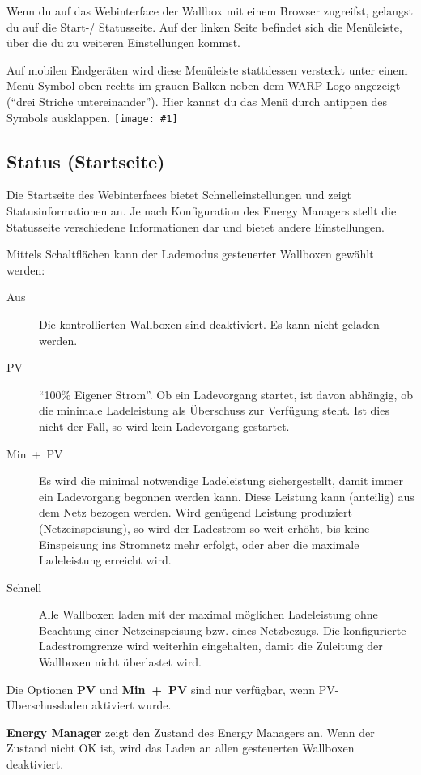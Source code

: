 \documentclass[a4paper,10pt]{article}
\newcommand{\gfx}[1]{\texttt{[image: \#1]}}
\begin{document}
\begin{multicols*}{2}
	Wenn du auf das Webinterface der Wallbox mit einem Browser zugreifst,
	gelangst du auf die Start-/ Statusseite. Auf der linken Seite befindet sich
	die Menüleiste, über die du zu weiteren Einstellungen kommst.

	Auf mobilen Endgeräten wird
	diese Menüleiste stattdessen versteckt unter einem Menü-Symbol oben rechts
	im grauen Balken neben dem WARP Logo angezeigt (\enquote{drei Striche untereinander}).
	Hier kannst du das Menü durch antippen des Symbols ausklappen.
	\gfx{./img_v2/wem2-web-status}

	\subsection{Status (Startseite)}
	\label{status}
	Die Startseite des Webinterfaces bietet Schnelleinstellungen und zeigt Statusinformationen an.
    Je nach Konfiguration des Energy Managers stellt die Statusseite verschiedene Informationen dar und bietet andere Einstellungen.

	Mittels Schaltflächen kann der Lademodus gesteuerter
	Wallboxen gewählt werden:
	\begin{description}
	\item[Aus] Die kontrollierten Wallboxen sind deaktiviert. Es kann
	nicht geladen werden.
	\item[PV] \enquote{100\% Eigener Strom}. Ob ein
	Ladevorgang startet, ist davon abhängig, ob die minimale Ladeleistung
	als Überschuss zur Verfügung steht. Ist dies nicht der Fall, so
	wird kein Ladevorgang gestartet.
	\item[Min~+~PV] Es wird die minimal notwendige Ladeleistung sichergestellt, damit immer ein Ladevorgang begonnen werden kann. Diese Leistung kann (anteilig) aus dem Netz bezogen werden. Wird genügend Leistung produziert (Netzeinspeisung), so wird
	der Ladestrom so weit erhöht, bis keine Einspeisung ins Stromnetz mehr
	erfolgt, oder aber die maximale Ladeleistung erreicht wird.
	\item[Schnell] Alle Wallboxen laden mit der maximal möglichen
	Ladeleistung ohne Beachtung einer Netzeinspeisung bzw. eines Netzbezugs. Die konfigurierte Ladestromgrenze wird weiterhin eingehalten, damit die Zuleitung der Wallboxen nicht überlastet wird.
	\end{description}
	Die Optionen \textbf{PV} und \textbf{Min~+~PV} sind nur verfügbar, wenn PV-Überschussladen aktiviert wurde.

	\textbf{Energy Manager} zeigt den Zustand des Energy Managers an. Wenn der Zustand nicht OK ist, wird das Laden an allen gesteuerten Wallboxen deaktiviert.


\end{multicols*}
\end{document}
